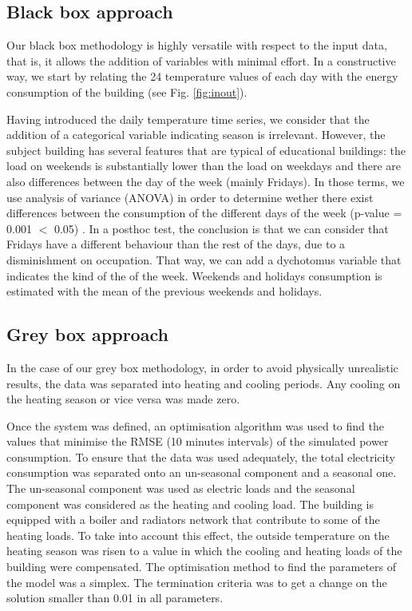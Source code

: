 \documentclass[3p,times,procedia]{elsarticle}
\begin{document}
\subsection{Black box approach}

Our black box methodology is highly versatile with respect to the input data, that is, it allows the addition of variables with minimal effort. In a constructive way, we start by relating the 24 temperature values of each day with the energy consumption of the building (see Fig. \ref{fig:inout}).

Having introduced the daily temperature time series, we consider that the addition of a categorical variable indicating season is irrelevant. However, the subject building has several features that are typical of educational buildings: the load %
on weekends is substantially lower than the load on weekdays and there are also differences between the day of the week (mainly Fridays).
In those terms, we use analysis of variance (ANOVA) in order to determine wether there exist differences between the consumption of the different days of the week (p-value = 0.001 $<$ 0.05) . 	In a posthoc test, the conclusion is that we can consider that Fridays have a different behaviour than the rest of the days, due to a disminishment on occupation. That way, we can add a dychotomus variable that indicates the kind of the of the week. Weekends and holidays consumption is estimated with the mean of the previous weekends and holidays.

\subsection{Grey box approach}

In the case of our grey box methodology, in order to avoid physically unrealistic results, the data was separated into heating and cooling periods. Any cooling on the heating season or vice versa was made zero.

Once the system was defined, an optimisation algorithm was used to find the values that minimise the RMSE (10 minutes intervals) of the simulated power consumption. To ensure that the data was used adequately, the total electricity consumption was separated onto an un-seasonal component and a seasonal one. The un-seasonal component was used as electric loads and the seasonal component was considered as the heating and cooling load. The building is equipped with a boiler and radiators network that contribute to some of the heating loads. To take into account this effect, the outside temperature on the heating season was risen to a value in which the cooling and heating loads of the building were compensated.
The optimisation method to find the parameters of the model was a simplex. The termination criteria was to get a change on the solution smaller than 0.01 in all parameters. %
\end{document}
